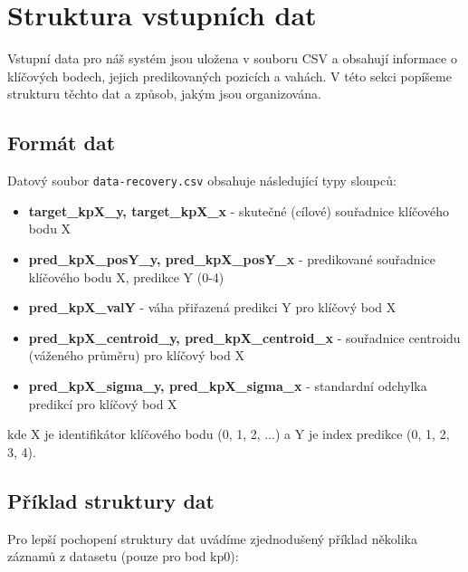 \section{Struktura vstupních dat}
\label{sec:data_structure}

Vstupní data pro náš systém jsou uložena v souboru CSV a obsahují informace o klíčových bodech, jejich predikovaných pozicích a vahách. V této sekci popíšeme strukturu těchto dat a způsob, jakým jsou organizována.

\subsection{Formát dat}

Datový soubor \texttt{data-recovery.csv} obsahuje následující typy sloupců:

\begin{itemize}
    \item \textbf{target\_kpX\_y, target\_kpX\_x} - skutečné (cílové) souřadnice klíčového bodu X
    \item \textbf{pred\_kpX\_posY\_y, pred\_kpX\_posY\_x} - predikované souřadnice klíčového bodu X, predikce Y (0-4)
    \item \textbf{pred\_kpX\_valY} - váha přiřazená predikci Y pro klíčový bod X
    \item \textbf{pred\_kpX\_centroid\_y, pred\_kpX\_centroid\_x} - souřadnice centroidu (váženého průměru) pro klíčový bod X
    \item \textbf{pred\_kpX\_sigma\_y, pred\_kpX\_sigma\_x} - standardní odchylka predikcí pro klíčový bod X
\end{itemize}

kde X je identifikátor klíčového bodu (0, 1, 2, ...) a Y je index predikce (0, 1, 2, 3, 4).

\subsection{Příklad struktury dat}

Pro lepší pochopení struktury dat uvádíme zjednodušený příklad několika záznamů z datasetu (pouze pro bod kp0):

